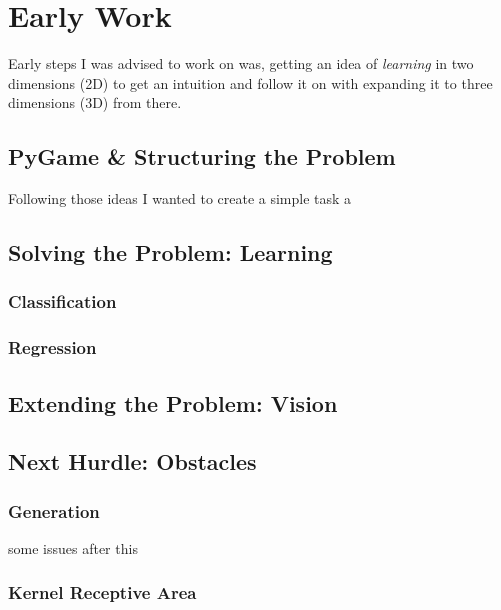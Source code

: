 \section{Early Work}
Early steps I was advised to work on was, getting an idea of \emph{learning} in two dimensions (2D) to get an intuition and follow it on with expanding it to three dimensions (3D) from there.

\subsection{PyGame \& Structuring the Problem}
Following those ideas I wanted to create a simple task a

\subsection{Solving the Problem: Learning}

\subsubsection{Classification}
\subsubsection{Regression}

\subsection{Extending the Problem: Vision}
\subsection{Next Hurdle: Obstacles}
\subsubsection{Generation}
some issues after this
\subsubsection{Kernel Receptive Area}